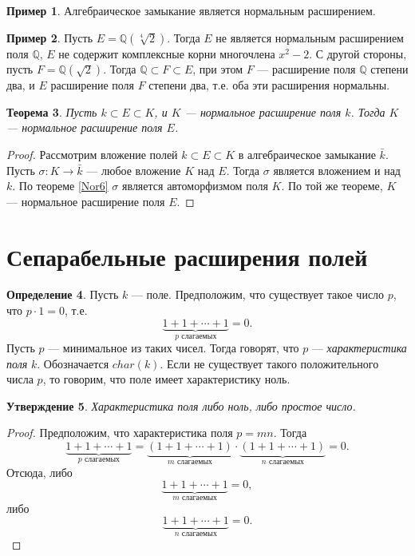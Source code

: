 \documentclass[12pt, titlepage, oneside]{amsbook}
\newcommand{\QQ}{\mathbb{Q}}
\newtheorem{theorem}{Теорема}[chapter]
\newtheorem{claim}[theorem]{Утверждение}
\theoremstyle{definition}
\newtheorem{example}[theorem]{Пример}
\newtheorem{definition}[theorem]{Определение}
\theoremstyle{remark}
\begin{document}
\begin{example}
Алгебраическое замыкание является нормальным расширением.
\end{example}

\begin{example}
Пусть $E=\QQ(\sqrt[4]{2})$. Тогда $E$ не является нормальным расширением поля $\QQ$, $E$ не содержит комплексные корни многочлена $x^2-2$. С другой стороны, пусть $F=\QQ(\sqrt{2})$. Тогда $\QQ\subset F\subset E$, при этом $F$ --- расширение поля $\QQ$ степени два, и $E$ расширение поля $F$ степени два, т.е. оба эти расширения нормальны.
\end{example}

\begin{theorem}
\label{Nor8}
Пусть $k\subset E\subset K$, и $K$ --- нормальное расширение поля $k$. Тогда $K$ --- нормальное расширение поля $E$.
\end{theorem}

\begin{proof}
Рассмотрим вложение полей $k\subset E\subset K$ в алгебраическое замыкание $\bar{k}$. Пусть $\sigma\colon K\rightarrow \bar{k}$ --- любое вложение $K$ над $E$. Тогда $\sigma$ является вложением и над $k$. По теореме \ref{Nor6} $\sigma$ является автоморфизмом поля $K$. По той же теореме, $K$ --- нормальное расширение поля $E$.
\end{proof}

\section{Сепарабельные расширения полей}

\begin{definition}
Пусть $k$ --- поле. Предположим, что существует такое число $p$, что $p\cdot 1=0$, т.е. $$\underbrace{1+1+\cdots+1}_{\text{$p$ слагаемых}}=0.$$ Пусть $p$ --- минимальное из таких чисел. Тогда говорят, что $p$ --- \emph{характеристика поля} $k$. Обозначается $char(k)$. Если не существует такого положительного числа $p$, то говорим, что поле имеет характеристику ноль.
\end{definition}

 \begin{claim}
\label{Har1}
Характеристика поля либо ноль, либо простое число.
\end{claim}

\begin{proof}
Предположим, что характеристика поля $p=mn$. Тогда $$\underbrace{1+1+\cdots+1}_{\text{$p$ слагаемых}}=\underbrace{(1+1+\cdots+1)}_{\text{$m$ слагаемых}}\cdot\underbrace{(1+1+\cdots+1)}_{\text{$n$ слагаемых}}=0.$$ Отсюда, либо $$\underbrace{1+1+\cdots+1}_{\text{$m$ слагаемых}}=0,$$ либо $$\underbrace{1+1+\cdots+1}_{\text{$n$ слагаемых}}=0.$$
\end{proof}
\end{document}
